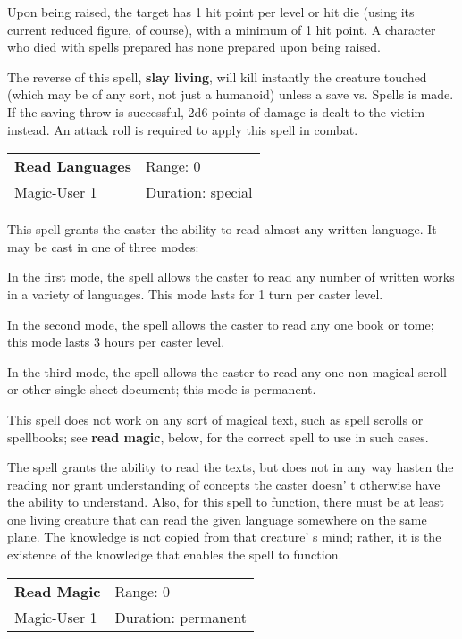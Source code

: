 \documentclass[a4paper,twoside,openany,10pt]{book}
\begin{document}
\begin{multicols}{2}
Upon being raised, the target has 1 hit point per level or hit die (using its current reduced figure, of course), with a minimum of 1 hit point. A character who died with spells prepared has none prepared upon being raised.

The reverse of this spell, \textbf{slay living}, will kill instantly the creature touched (which may be of any sort, not just a humanoid) unless a save vs. Spells is made. If the saving throw is successful, 2d6 points of damage is dealt to the victim instead. An attack roll is required to apply this spell in combat. 

\smallskip\begin{flushleft} 
	\begin{tabularx}{0.45\textwidth}{@{}m{3.5cm}m{5.5cm}@{}} 
		\textbf{Read Languages} & Range: 0\\
Magic-User 1 & Duration: special\\
	\end{tabularx}\end{flushleft}

This spell grants the caster the ability to read almost any written language. It may be cast in one of three modes:

In the first mode, the spell allows the caster to read any number of written works in a variety of languages. This mode lasts for 1 turn per caster level.

In the second mode, the spell allows the caster to read any one book or tome; this mode lasts 3 hours per caster level. 

In the third mode, the spell allows the caster to read any one non-magical scroll or other single-sheet document; this mode is permanent.

This spell does not work on any sort of magical text, such as spell scrolls or spellbooks; see \textbf{read magic}, below, for the correct spell to use in such cases.

The spell grants the ability to read the texts, but does not in any way hasten the reading nor grant understanding of concepts the caster doesn' t otherwise have the ability to understand. Also, for this spell to function, there must be at least one living creature that can read the given language somewhere on the same plane. The knowledge is not copied from that creature' s mind; rather, it is the existence of the knowledge that enables the spell to function. 

\smallskip\begin{flushleft} 
	\begin{tabularx}{0.45\textwidth}{@{}m{3.5cm}m{5.5cm}@{}} 
		\textbf{Read Magic} & Range: 0\\
Magic-User 1 &Duration: permanent\\
	\end{tabularx}\end{flushleft}


\end{multicols}
\end{document}
